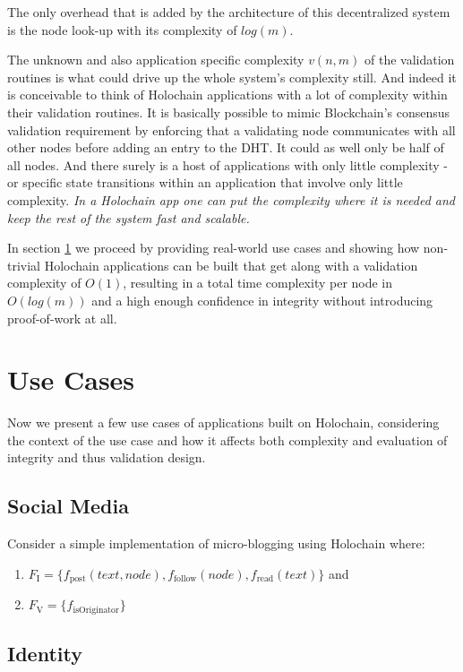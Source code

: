 \documentclass[twocolumn,showpacs,%
  nofootinbib,aps,superscriptaddress,%
  eqsecnum,prd,notitlepage,showkeys,10pt]{revtex4-1}
\begin{document}
The only overhead that is added by the architecture of this decentralized system is the node look-up with its complexity of $log(m)$.

The unknown and also application specific complexity $v(n,m)$ of the validation routines is what could drive up the whole system's complexity still. And indeed it is conceivable to think of Holochain applications with a lot of complexity within their validation routines. It is basically possible to mimic Blockchain's consensus validation requirement by enforcing that a validating node communicates with all other nodes before adding an entry to the DHT. It could as well only be half of all nodes. And there surely is a host of applications with only little complexity - or specific state transitions within an application that involve only little complexity. \textit{In a Holochain app one can put the complexity where it is needed and keep the rest of the system fast and scalable.}

In section \ref{sec:usecases} we proceed by providing real-world use cases and showing how non-trivial Holochain applications can be built that get along with a validation complexity of $O(1)$, resulting in a total time complexity per node in $O(log(m))$ and a high enough confidence in integrity without introducing proof-of-work at all.

\section{Use Cases}
\label{sec:usecases}

Now we present a few use cases of applications built on Holochain, considering the context of the use case and how it affects both complexity and evaluation of integrity and thus validation design.

\subsection{Social Media}
Consider a simple implementation of micro-blogging using Holochain where:
\begin{enumerate}
\item $F_\mathrm{I}=\{f_\mathrm{post}(text,node),f_\mathrm{follow}(node),f_\mathrm{read}(text)\}$ and

\item $F_\mathrm{V}=\{f_\mathrm{isOriginator}\}$
\end{enumerate}

\subsection{Identity}
\end{document}
